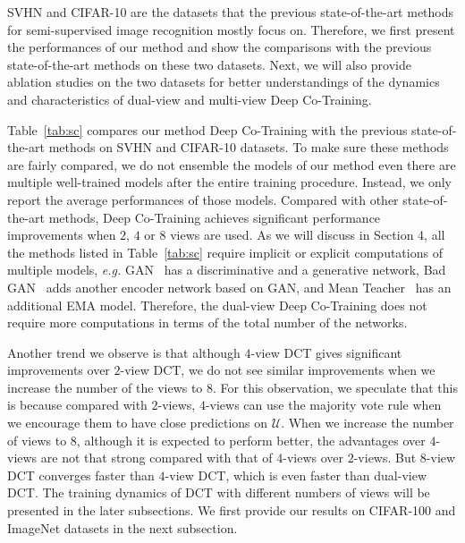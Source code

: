 \documentclass[runningheads]{llncs}
\begin{document}
SVHN and CIFAR-10 are the datasets that the previous state-of-the-art methods for semi-supervised image recognition mostly focus on.
Therefore, we first present the performances of our method and show the comparisons with the previous state-of-the-art methods on these two datasets.
Next, we will also provide ablation studies on the two datasets for better understandings of the dynamics and characteristics of dual-view and multi-view Deep Co-Training.

Table~\ref{tab:sc} compares our method Deep Co-Training with the previous state-of-the-art methods on SVHN and CIFAR-10 datasets.
To make sure these methods are fairly compared, we do not ensemble the models of our method even there are multiple well-trained models after the entire training procedure. Instead, we only report the average performances of those models.
Compared with other state-of-the-art methods, Deep Co-Training achieves significant performance improvements when $2$, $4$ or $8$ views are used.
As we will discuss in Section 4, all the methods listed in Table~\ref{tab:sc} require implicit or explicit computations of multiple models, \textit{e.g.} GAN~\cite{igan} has a discriminative and a generative network, Bad GAN~\cite{badgan} adds another encoder network based on GAN, and Mean Teacher~\cite{mean} has an additional EMA model.
Therefore, the dual-view Deep Co-Training does not require more computations in terms of the total number of the networks.

Another trend we observe is that although $4$-view DCT gives significant improvements over $2$-view DCT, we do not see similar improvements when we increase the number of the views to $8$.
For this observation, we speculate that this is because compared with $2$-views, $4$-views can use the majority vote rule when we encourage them to have close predictions on $\mathcal{U}$.
When we increase the number of views to $8$, although it is expected to perform better, the advantages over $4$-views are not that strong compared with that of $4$-views over $2$-views.
But $8$-view DCT converges faster than $4$-view DCT, which is even faster than dual-view DCT.
The training dynamics of DCT with different numbers of views will be presented in the later subsections.
We first provide our results on CIFAR-100 and ImageNet datasets in the next subsection.
\end{document}

